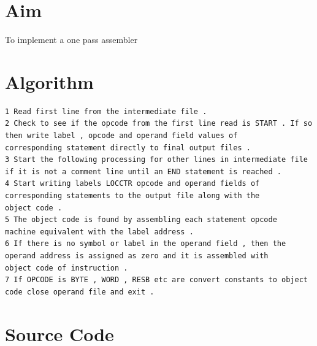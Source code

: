 \documentclass[13pt,oneside]{book}
\begin{document}
\section*{Aim}
\large
To implement a one pass assembler

\section*{Algorithm} 
    \begin{verbatim}
1 Read first line from the intermediate file .
2 Check to see if the opcode from the first line read is START . If so
then write label , opcode and operand field values of
corresponding statement directly to final output files .
3 Start the following processing for other lines in intermediate file
if it is not a comment line until an END statement is reached .
4 Start writing labels LOCCTR opcode and operand fields of
corresponding statements to the output file along with the
object code .
5 The object code is found by assembling each statement opcode
machine equivalent with the label address .
6 If there is no symbol or label in the operand field , then the
operand address is assigned as zero and it is assembled with
object code of instruction .
7 If OPCODE is BYTE , WORD , RESB etc are convert constants to object
code close operand file and exit .
	\end{verbatim}

\section*{Source Code}
\small
\end{document}
